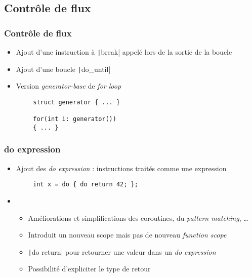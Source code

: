 \documentclass[C++.tex]{subfiles}
\begin{document}
\subsection*{Contrôle de flux}
\begin{frame}[fragile]
	\frametitle{Contrôle de flux}
	\begin{itemize}
		\item Ajout d'une instruction à \texttt|break| appelé lors de la sortie de la boucle


		\item Ajout d'une boucle \texttt|do_until|
		\item Version \textit{generator-base} de \textit{for loop}
	\end{itemize}

	\begin{verbatim}
		struct generator { ... }

		for(int i: generator())
		{ ... }
	\end{verbatim}
\end{frame}

\begin{frame}[fragile]
	\frametitle{do expression}
	\begin{itemize}
		\item Ajout des \og{}\textit{do expression}\fg{} : instructions traités comme une expression
	\end{itemize}

	\begin{verbatim}
		int x = do { do return 42; };
	\end{verbatim}

	\begin{itemize}
		\item[]
		\begin{itemize}
			\item Améliorations et simplifications des coroutines, du \textit{pattern matching}, \ldots{}
			\item Introduit un nouveau scope mais pas de nouveau \textit{function scope}
			\item \texttt|do return| pour retourner une valeur dans un \textit{do expression}
			\item Possibilité d'expliciter le type de retour
		\end{itemize}
	\end{itemize}
\end{frame}
\end{document}
